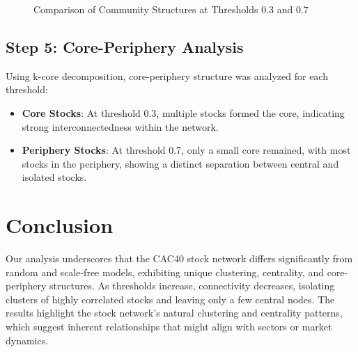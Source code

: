 \documentclass[12pt]{article}
\begin{document}
\begin{figure}[H]
\begin{minipage}[b]{0.45\textwidth}
        \label{fig:louvain_07}
    \end{minipage}
    \caption{Comparison of Community Structures at Thresholds 0.3 and 0.7}
    \label{fig:community_structures}
\end{figure}
\subsection{Step 5: Core-Periphery Analysis}
Using k-core decomposition, core-periphery structure was analyzed for each threshold:
\begin{itemize}
    \item \textbf{Core Stocks}: At threshold 0.3, multiple stocks formed the core, indicating strong interconnectedness within the network.
    \item \textbf{Periphery Stocks}: At threshold 0.7, only a small core remained, with most stocks in the periphery, showing a distinct separation between central and isolated stocks.
\end{itemize}

\section{Conclusion}

Our analysis underscores that the CAC40 stock network differs significantly from random and scale-free models, exhibiting unique clustering, centrality, and core-periphery structures. As thresholds increase, connectivity decreases, isolating clusters of highly correlated stocks and leaving only a few central nodes. The results highlight the stock network’s natural clustering and centrality patterns, which suggest inherent relationships that might align with sectors or market dynamics.

%
%
\end{document}
